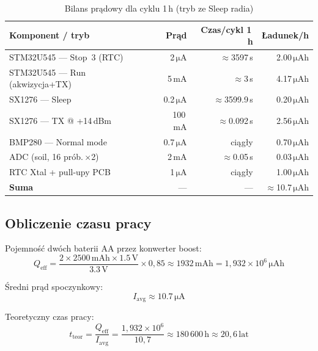 \documentclass[12pt,a4paper]{article}
\newcommand{\qty}[2]{#1\,\ensuremath{#2}}
\newcommand{\si}[1]{\ensuremath{#1}}
\newcommand{\milli}{\mathrm{m}}
\newcommand{\micro}{\mathrm{\mu}}
\newcommand{\ampere}{\mathrm{A}}
\newcommand{\volt}{\mathrm{V}}
\newcommand{\hour}{\mathrm{h}}
\begin{document}
\begin{table}[H]
\centering
\caption{Bilans prądowy dla cyklu 1\,h (tryb ze Sleep radia)}
\begin{tabular}{lrrr}
\toprule
\textbf{Komponent / tryb} & \textbf{Prąd} & \textbf{Czas/cykl 1\,h} & \textbf{Ładunek/h} \\
\midrule
STM32U545 — Stop~3 (RTC) & \qty{2}{\micro\ampere}   & $\approx$3597\,s   & \qty{2.00}{\micro\ampere\hour} \\
STM32U545 — Run (akwizycja+TX) & \qty{5}{\milli\ampere} & $\approx$3\,s   & \qty{4.17}{\micro\ampere\hour} \\
SX1276 — Sleep            & \qty{0.2}{\micro\ampere} & $\approx$3599.9\,s & \qty{0.20}{\micro\ampere\hour} \\
SX1276 — TX @ +14\,dBm   & \qty{100}{\milli\ampere} & $\approx$0.092\,s  & \qty{2.56}{\micro\ampere\hour} \\
BMP280 — Normal mode      & \qty{0.7}{\micro\ampere} & ciągły             & \qty{0.70}{\micro\ampere\hour} \\
ADC (soil, 16 prób.\,$\times$2) & \qty{2}{\milli\ampere} & $\approx$0.05\,s & \qty{0.03}{\micro\ampere\hour} \\
RTC Xtal + pull-upy PCB   & \qty{1}{\micro\ampere}   & ciągły             & \qty{1.00}{\micro\ampere\hour} \\
\midrule
\textbf{Suma}             & —                        & —                  & $\approx$\qty{10.7}{\micro\ampere\hour} \\
\bottomrule
\end{tabular}
\end{table}

\subsection{Obliczenie czasu pracy}

Pojemność dwóch baterii AA przez konwerter boost:
\[
  Q_{\text{eff}}
  = \frac{2 \times \qty{2500}{\milli\ampere\hour} \times \qty{1.5}{\volt}}
         {\qty{3.3}{\volt}} \times 0{,}85
  \approx \qty{1932}{\milli\ampere\hour}
  = 1{,}932 \times 10^{6}\,\si{\micro\ampere\hour}
\]

Średni prąd spoczynkowy:
\[
  I_{\text{avg}} \approx \qty{10.7}{\micro\ampere}
\]

Teoretyczny czas pracy:
\[
  t_{\text{teor}}
  = \frac{Q_{\text{eff}}}{I_{\text{avg}}}
  = \frac{1{,}932 \times 10^{6}}{10{,}7}
  \approx 180\,600\,\text{h}
  \approx 20{,}6\,\text{lat}
\]
\end{document}
